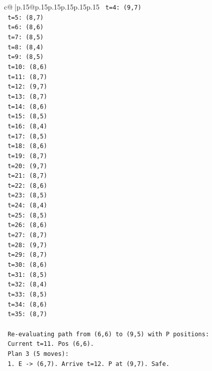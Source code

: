 \documentclass{article}
\begin{document}
{\begin{supertabular}{c@{$\;$}|p{.15\linewidth}@{}p{.15\linewidth}p{.15\linewidth}p{.15\linewidth}p{.15\linewidth}p{.15\linewidth}}
{{{\texttt{     t=4: (9,7)} \\
\texttt{     t=5: (8,7)} \\
\texttt{     t=6: (8,6)} \\
\texttt{     t=7: (8,5)} \\
\texttt{     t=8: (8,4)} \\
\texttt{     t=9: (8,5)} \\
\texttt{     t=10: (8,6)} \\
\texttt{     t=11: (8,7)} \\
\texttt{     t=12: (9,7)} \\
\texttt{     t=13: (8,7)} \\
\texttt{     t=14: (8,6)} \\
\texttt{     t=15: (8,5)} \\
\texttt{     t=16: (8,4)} \\
\texttt{     t=17: (8,5)} \\
\texttt{     t=18: (8,6)} \\
\texttt{     t=19: (8,7)} \\
\texttt{     t=20: (9,7)} \\
\texttt{     t=21: (8,7)} \\
\texttt{     t=22: (8,6)} \\
\texttt{     t=23: (8,5)} \\
\texttt{     t=24: (8,4)} \\
\texttt{     t=25: (8,5)} \\
\texttt{     t=26: (8,6)} \\
\texttt{     t=27: (8,7)} \\
\texttt{     t=28: (9,7)} \\
\texttt{     t=29: (8,7)} \\
\texttt{     t=30: (8,6)} \\
\texttt{     t=31: (8,5)} \\
\texttt{     t=32: (8,4)} \\
\texttt{     t=33: (8,5)} \\
\texttt{     t=34: (8,6)} \\
\texttt{     t=35: (8,7)} \\
\\ 
\texttt{   Re{-}evaluating path from (6,6) to (9,5) with P positions:} \\
\texttt{   Current t=11. Pos (6,6).} \\
\texttt{   Plan 3 (5 moves):} \\
\texttt{   1. E {-}> (6,7). Arrive t=12. P at (9,7). Safe.} \\
}}}
\end{supertabular}}
\end{document}
